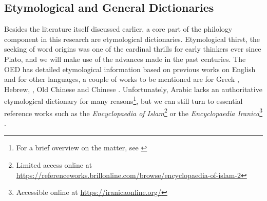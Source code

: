 \subsection{Etymological and General Dictionaries}

Besides the literature itself discussed earlier, a core part of the philology component in this research are etymological dictionaries. Etymological thirst, the seeking of word origins was one of the cardinal thrills for early thinkers ever since Plato, and we will make use of the advances made in the past centuries. The \gls{OED} has detailed etymological information based on previous works on English and for other languages, a couple of works to be mentioned are for Greek \textcite{beekes_etymological_2010}, Hebrew, \textcite{klein_comprehensive_1987}, Old Chinese \textcite{schuessler_abc_2007} and Chinese \textcite{liu_hanyu_1985}. Unfortunately, Arabic lacks an authoritative etymological dictionary for many reasons\footnote{For a brief overview on the matter, see \textcite{blazek_etymology_2006}}, but we can still turn to essential reference works such as the \textit{Encyclopaedia of Islam}\footnote{Limited access online at \url{https://referenceworks.brillonline.com/browse/encyclopaedia-of-islam-2}} \autocite{ei2} or the \textit{Encyclopaedia Iranica}\footnote{Accessible online at \url{https://iranicaonline.org/}} \autocite{eir}. 











